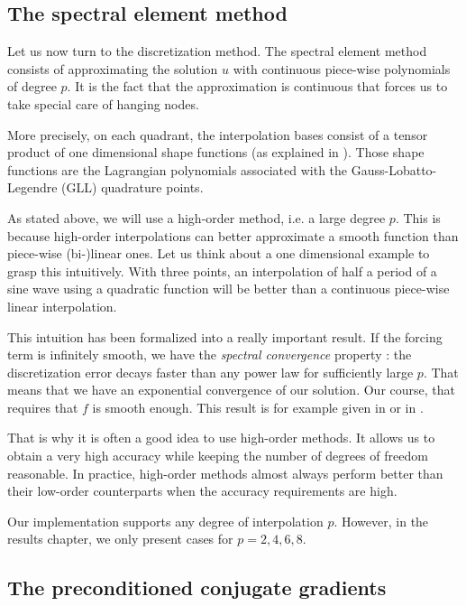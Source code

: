 \subsection*{The spectral element method}

Let us now turn to the discretization method. The spectral element method consists of approximating the solution $u$ with continuous piece-wise polynomials of degree $p$. It is the fact that the approximation is continuous that forces us to take special care of hanging nodes. 

More precisely, on each quadrant, the interpolation bases consist of a tensor product of one dimensional shape functions (as explained in \cite{specEff}). Those shape functions are the Lagrangian polynomials associated with the Gauss-Lobatto-Legendre (GLL) quadrature points. 

As stated above, we will use a high-order method, i.e. a large degree $p$. This is because high-order interpolations can better approximate a smooth function than piece-wise (bi-)linear ones. Let us think about a one dimensional example to grasp this intuitively. With three points, an interpolation of half a period of a sine wave using a quadratic function will be better than a continuous piece-wise linear interpolation. 

This intuition has been formalized into a really important result. If the forcing term is infinitely smooth, we have the \textit{spectral convergence} property : the discretization error decays faster than any power law for sufficiently large $p$. That means that we have an exponential convergence of our solution. Our course, that requires that $f$  is smooth enough. This result is for example given in \cite{expConv} or in \cite{specConv}.

That is why it is often a good idea to use high-order methods. It allows us to obtain a very high accuracy while keeping the number of degrees of freedom reasonable. In practice, high-order methods almost always perform better than their low-order counterparts when the accuracy requirements are high.   

Our implementation supports any degree of interpolation $p$. However, in the results chapter, we only present cases for $p=2,4,6,8$. 

\subsection*{The preconditioned conjugate gradients}

